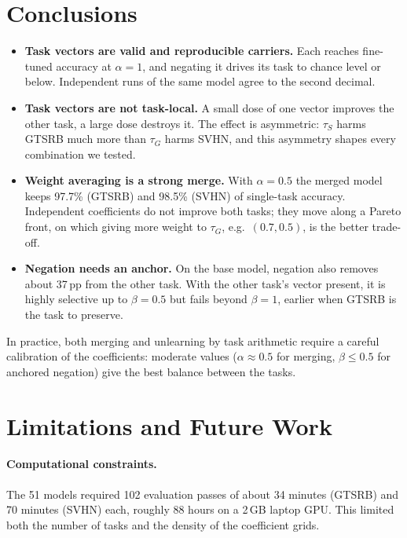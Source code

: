 \documentclass[11pt,a4paper,twocolumn]{article}
\newcommand{\tG}{\tau_G}
\newcommand{\tS}{\tau_S}
\newcommand{\pp}{\,pp}
\begin{document}
\section{Conclusions}

\begin{itemize}
  \item \textbf{Task vectors are valid and reproducible carriers.} Each
  reaches fine-tuned accuracy at $\alpha=1$, and negating it drives its
  task to chance level or below. Independent runs of the same model
  agree to the second decimal.
  \item \textbf{Task vectors are not task-local.} A small dose of one
  vector improves the other task, a large dose destroys it. The effect is
  asymmetric: $\tS$ harms GTSRB much more than $\tG$ harms SVHN, and this
  asymmetry shapes every combination we tested.
  \item \textbf{Weight averaging is a strong merge.} With $\alpha=0.5$ the
  merged model keeps 97.7\% (GTSRB) and 98.5\% (SVHN) of single-task
  accuracy. Independent coefficients do not improve both tasks; they move
  along a Pareto front, on which giving more weight to $\tG$, e.g.\
  $(0.7,0.5)$, is the better trade-off.
  \item \textbf{Negation needs an anchor.} On the base model, negation
  also removes about 37\pp{} from the other task. With the other task's
  vector present, it is highly selective up to $\beta=0.5$ but fails
  beyond $\beta=1$, earlier when GTSRB is the task to preserve.
\end{itemize}

In practice, both merging and unlearning by task arithmetic require a
careful calibration of the coefficients: moderate values ($\alpha\approx
0.5$ for merging, $\beta\le0.5$ for anchored negation) give the best
balance between the tasks.

\section{Limitations and Future Work}
\label{sec:limits}

\paragraph{Computational constraints.} The 51 models required 102
evaluation passes of about 34 minutes (GTSRB) and 70 minutes (SVHN) each,
roughly 88 hours on a 2\,GB laptop GPU. This limited both the number of
tasks and the density of the coefficient grids.
\end{document}
